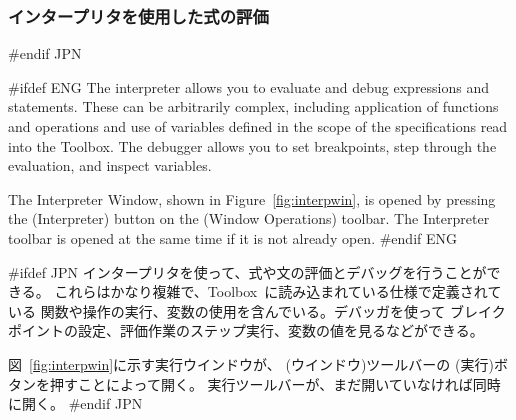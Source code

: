 \documentclass[\pformat,12pt]{article}
\newcommand{\Toolbox}{Toolbox}
\newcommand{\Toolbox}{Toolbox}
\newcommand{\guicmd}[1]{{\sf #1}}
\newcommand{\guicmd}[1]{{\gt #1}}
\begin{document}
\subsubsection{インタープリタを使用した式の評価}
\label{interpreter}
#endif JPN

#ifdef ENG
The interpreter allows you to evaluate and debug expressions and
statements.  These can be arbitrarily complex, including application
of functions and operations and use of variables defined in the scope
of the specifications read into the \Toolbox.  The debugger allows you
to set breakpoints, step through the evaluation, and inspect variables.

The \guicmd{Interpreter Window}, shown in
Figure~\ref{fig:interpwin}, is opened by pressing the 
(\guicmd{Interpreter}) button on the (\guicmd{Window Operations})
toolbar. The \guicmd{Interpreter} toolbar is opened at the same
time if it is not already open.
#endif ENG

#ifdef JPN
インタープリタを使って、式や文の評価とデバッグを行うことができる。
これらはかなり複雑で、\Toolbox\ に読み込まれている仕様で定義されている
関数や操作の実行、変数の使用を含んでいる。デバッガを使って
ブレイクポイントの設定、評価作業のステップ実行、変数の値を見るなどができる。

図~\ref{fig:interpwin}に示す\guicmd{実行ウインドウ}が、
(\guicmd{ウインドウ})ツールバーの  
(\guicmd{実行})ボタンを押すことによって開く。
\guicmd{実行}ツールバーが、まだ開いていなければ同時に開く。
#endif JPN
\end{document}
